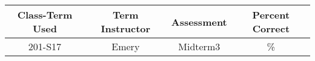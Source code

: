 \begin{outcomes}
	\begin{center}
		\begin{tabular}{cccc}
			\hline\hline
			Class-Term Used & Term Instructor & Assessment & Percent Correct\\
			\hline
			201-S17 & Emery & Midterm3 & \%\\    %
			\hline
		\end{tabular}
	\end{center}
\end{outcomes}

\begin{comments}

	
\end{comments}

